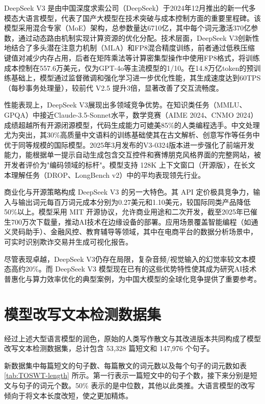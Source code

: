 DeepSeek V3 \cite{deepseekai2024deepseekv3technicalreport} 是由中国深度求索公司（DeepSeek）于2024年12月推出的新一代多模态大语言模型，代表了国产大模型在技术突破与成本控制方面的重要里程碑。该模型采用混合专家（MoE）架构，总参数量达6710亿，其中每个词元激活370亿参数，通过动态路由机制实现计算资源的优化分配。技术层面，DeepSeek V3创新性地结合了多头潜在注意力机制（MLA）和FP8混合精度训练，前者通过低秩压缩键值对减少内存占用，后者在矩阵乘法等计算密集型操作中使用FP8格式，将训练成本控制在557.6万美元，仅为GPT-4o等主流模型的1/10。在14.8万亿token的预训练基础上，模型通过监督微调和强化学习进一步优化性能，其生成速度达到60TPS（每秒事务处理量），较前代 V2.5 提升3倍，显著改善了交互流畅度。

性能表现上，DeepSeek V3展现出多领域竞争优势。在知识类任务（MMLU、GPQA）中接近Claude-3.5-Sonnet水平，数学竞赛（AIME 2024、CNMO 2024）成绩超越所有开源闭源模型，代码生成能力可媲美85\%的人类编程选手。中文处理尤为突出，其30\%高质量中文语料的训练基础使其在古文解析、创意写作等任务中优于同等规模的国际模型。2025年3月发布的V3-0324版本进一步强化了前端开发能力，能根据单一提示自动生成包含交互控件和赛博朋克风格界面的完整网站，被开发者评价为"编码领域的标杆"。模型支持 128K 上下文窗口（开源版），在长文本理解任务（DROP、LongBench v2）中的平均表现领先行业。

商业化与开源策略构成 DeepSeek V3 的另一大特色。其 API 定价极具竞争力，输入与输出词元每百万词元成本分别为0.27美元和1.10美元，较国际同类产品降低50\%以上。模型采用 MIT 开源协议，允许商业用途和二次开发，截至2025年已催生700万次下载量，推动AI技术在边缘设备的部署。应用场景覆盖智能编程（如通义灵码助手）、金融风控、教育辅导等领域，其中在电商平台的数据分析场景中，可实时识别欺诈交易并生成可视化报告。

尽管表现卓越，DeepSeek V3仍存在局限，复杂音频/视觉输入的幻觉率较文本模态高约20\%。而 DeepSeek V3 模型现在已有的这些优势特性使其成为研究AI技术普惠化与算力效率优化的典型案例，为中国大模型的全球化竞争提供了重要参考。

\section{模型改写文本检测数据集}
\label{sec:TOSWT-info}

经过上述大型语言模型的润色，原始的人类写作散文与其改进版本共同构成了模型改写文本检测数据集，总计包含 53,328 篇短文和 147,976 个句子。

新数据集中每篇短文的句子数、每篇散文的词元数以及每个句子的词元数如表 \ref{tab:TOSWT-length} 所示。第一行表示一篇短文中的句子个数，接下来分别是短文与句子的词元个数。50\% 表示的是中位数，其他以此类推。大语言模型的改写倾向于将文本长度改短，使之更加精炼。

